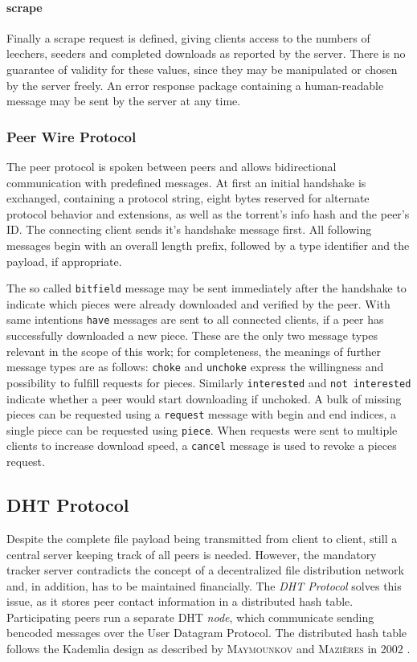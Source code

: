 \documentclass[10pt, a4paper, twoside]{scrartcl}
\renewcommand{\_}{\origunderscore\allowbreak}
\begin{document}
\paragraph{scrape}
Finally a scrape request is defined, giving clients access to the numbers of leechers, seeders and completed downloads as reported by the server. There is no guarantee of validity for these values, since they may be manipulated or chosen by the server freely. An error response package containing a human-readable message may be sent by the server at any time.

\subsubsection{Peer Wire Protocol}
The peer protocol is spoken between peers and allows bidirectional communication with predefined messages. At first an initial handshake is exchanged, containing a protocol string, eight bytes reserved for alternate protocol behavior and extensions, as well as the torrent's info hash and the peer's ID. The connecting client sends it's handshake message first. All following messages begin with an overall length prefix, followed by a type identifier and the payload, if appropriate.

The so called \texttt{bitfield} message may be sent immediately after the handshake to indicate which pieces were already downloaded and verified by the peer. With same intentions \texttt{have} messages are sent to all connected clients, if a peer has successfully downloaded a new piece. These are the only two message types relevant in the scope of this work; for completeness, the meanings of further message types are as follows: \texttt{choke} and \texttt{unchoke} express the willingness and possibility to fulfill requests for pieces. Similarly \texttt{interested} and \texttt{not interested} indicate whether a peer would start downloading if unchoked. A bulk of missing pieces can be requested using a \texttt{request} message with begin and end indices, a single piece can be requested using \texttt{piece}. When requests were sent to multiple clients to increase download speed, a \texttt{cancel} message is used to revoke a pieces request.

\subsection{DHT Protocol}
Despite the complete file payload being transmitted from client to client, still a central server keeping track of all peers is needed. However, the mandatory tracker server contradicts the concept of a decentralized file distribution network and, in addition, has to be maintained financially. The \emph{DHT Protocol} \cite{bep5} solves this issue, as it stores peer contact information in a distributed hash table. Participating peers run a separate DHT \emph{node}, which communicate sending bencoded messages over the User Datagram Protocol. The distributed hash table follows the Kademlia design as described by \textsc{Maymounkov} and \textsc{Mazières} in 2002 \cite{kademlia}.
\end{document}
